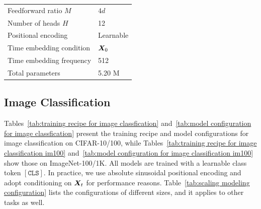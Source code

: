 \begin{table}[htbp]
\begin{minipage}[t]{0.49\textwidth}
\begin{tabular}{ll}
            Feedforward ratio $M$ & $4d$ \\
            Number of heads $H$ & 12 \\
            Positional encoding & Learnable \\
            Time embedding condition & ${\bm{X}}_0$ \\
            Time embedding frequency & 512 \\
            \midrule
            Total parameters & 5.20 M \\
            \bottomrule
        \end{tabular}
    \end{minipage}
\end{table}

\subsection{Image Classification}
\label{section:image classification setup}
Tables~\ref{tab:training recipe for image classfication} and~\ref{tab:model configuration for image classfication} present the training recipe and model configurations for image classification on CIFAR-10/100, while Tables~\ref{tab:training recipe for image classification im100} and~\ref{tab:model configuration for image classification im100} show those on ImageNet-100/1K. All models are trained with a learnable class token $[\texttt{CLS}]$. In practice, we use absolute sinusoidal positional encoding and adopt conditioning on ${\bm{X}}_t$ for performance reasons. Table~\ref{tab:scaling modeling configuration} lists the configurations of different sizes, and it applies to other tasks as well.

        
